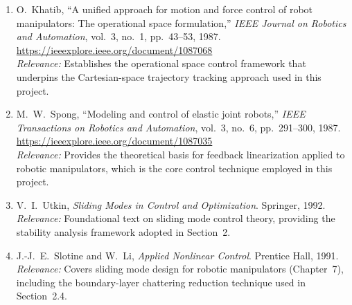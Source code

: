 \documentclass[11pt,a4paper]{article}
\begin{document}
\begin{enumerate}
  \item O.~Khatib, ``A unified approach for motion and force control of robot
    manipulators: The operational space formulation,'' \textit{IEEE Journal on
    Robotics and Automation}, vol.~3, no.~1, pp.~43--53, 1987.\\
    \url{https://ieeexplore.ieee.org/document/1087068}\\
    \textit{Relevance:} Establishes the operational space control framework that
    underpins the Cartesian-space trajectory tracking approach used in this
    project.

  \item M.~W.~Spong, ``Modeling and control of elastic joint robots,''
    \textit{IEEE Transactions on Robotics and Automation}, vol.~3, no.~6,
    pp.~291--300, 1987.\\
    \url{https://ieeexplore.ieee.org/document/1087035}\\
    \textit{Relevance:} Provides the theoretical basis for feedback linearization
    applied to robotic manipulators, which is the core control technique employed
    in this project.

  \item V.~I.~Utkin, \textit{Sliding Modes in Control and Optimization}.
    Springer, 1992.\\
    \textit{Relevance:} Foundational text on sliding mode control theory,
    providing the stability analysis framework adopted in Section~2.

  \item J.-J.~E.~Slotine and W.~Li, \textit{Applied Nonlinear Control}.
    Prentice Hall, 1991.\\
    \textit{Relevance:} Covers sliding mode design for robotic manipulators
    (Chapter~7), including the boundary-layer chattering reduction technique
    used in Section~2.4.
\end{enumerate}
\end{document}
